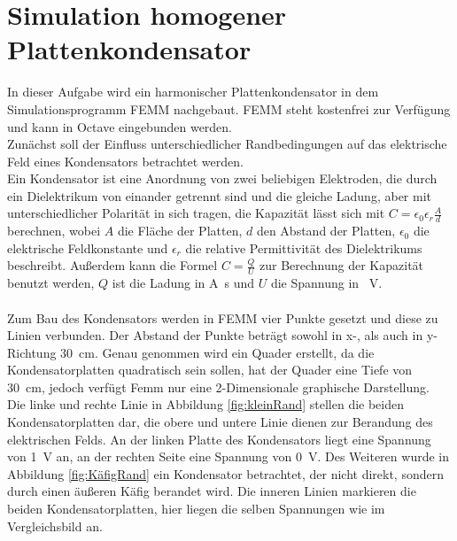 \section{Simulation homogener Plattenkondensator}\label{sec:ag3_3}
In dieser Aufgabe wird ein harmonischer Plattenkondensator in dem Simulationsprogramm \glqq FEMM \grqq{} nachgebaut. FEMM steht kostenfrei zur Verfügung und kann in Octave eingebunden werden.\\
Zunächst soll der Einfluss unterschiedlicher Randbedingungen auf das elektrische Feld eines Kondensators betrachtet werden. \\
Ein Kondensator ist eine Anordnung von zwei beliebigen Elektroden, die durch ein Dielektrikum von einander getrennt sind und die gleiche Ladung, aber mit unterschiedlicher Polarität in sich tragen, die Kapazität lässt sich mit $ C = \epsilon_{0}\epsilon_{r}\frac{A}{d}$ berechnen, wobei $A$ die Fläche der Platten, $d$ den Abstand der Platten, $\epsilon_{0}$ die elektrische Feldkonstante und $\epsilon_{r}$ die relative Permittivität des Dielektrikums beschreibt. Außerdem kann die Formel $C = \frac{Q}{U}$ zur Berechnung der Kapazität benutzt werden, $Q$ ist die Ladung in \si{\ampere\second} und $U$ die Spannung in \SI{}{\volt}. \\ \\
Zum Bau des Kondensators werden in FEMM vier Punkte gesetzt und diese zu Linien verbunden. Der Abstand der Punkte beträgt sowohl in x-, als auch in y-Richtung \SI{30}{\centi\meter}. Genau genommen wird ein Quader erstellt, da die Kondensatorplatten quadratisch sein sollen, hat der Quader eine Tiefe von \SI{30}{\centi\meter}, jedoch verfügt Femm nur eine 2-Dimensionale graphische Darstellung.\\
 Die linke und rechte Linie in Abbildung \ref{fig:kleinRand} stellen die beiden Kondensatorplatten dar, die obere und untere Linie dienen zur Berandung des elektrischen Felds. An der linken Platte des Kondensators liegt eine Spannung von \SI{1}{\volt} an, an der rechten Seite eine Spannung von \SI{0}{\volt}. Des Weiteren wurde in Abbildung \ref{fig:KäfigRand} ein Kondensator betrachtet, der nicht direkt, sondern durch einen äußeren Käfig berandet wird. Die inneren Linien markieren die beiden Kondensatorplatten, hier liegen die selben Spannungen wie im Vergleichsbild an.
